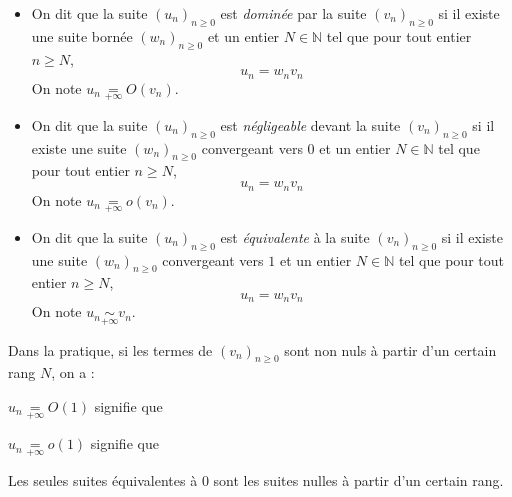 \documentclass[a4paper,10pt]{report}
\begin{document}
\begin{defin}

\begin{itemize}
\item On dit que la suite $(u_n)_{n \geq 0}$ est \textit{dominée} par la suite $(v_n)_{n \geq 0}$ si il existe une suite bornée $(w_n)_{n \geq 0}$ et un entier $N \in \mathbb{N}$ tel que pour tout entier $n \geq N$,
$$ u_n = w_n v_n$$
On note $u_n  \underset{+ \infty}{=} O(v_n)$.
\item On dit que la suite $(u_n)_{n \geq 0}$ est \textit{négligeable} devant la suite $(v_n)_{n \geq 0}$ si il existe une suite  $(w_n)_{n \geq 0}$ convergeant vers $0$ et un entier $N \in \mathbb{N}$ tel que pour tout entier $n \geq N$,
$$ u_n = w_n v_n$$
On note $u_n \underset{ + \infty}{=} o(v_n)$.
\item On dit que la suite $(u_n)_{n \geq 0}$ est \textit{équivalente} à la suite $(v_n)_{n \geq 0}$ si il existe une suite  $(w_n)_{n \geq 0}$ convergeant vers $1$ et un entier $N \in \mathbb{N}$ tel que pour tout entier $n \geq N$,
$$ u_n = w_n v_n$$
On note $u_n  \underset{ + \infty}{\sim} v_n$.
\end{itemize}
\end{defin}

\medskip

\noindent Dans la pratique, si les termes de $(v_n)_{n \geq 0}$ sont non nuls à partir d'un certain rang $N$, on a :
%
%

\newpage

\begin{rems}
\item $u_n  \underset{+ \infty}{=} O(1)$ signifie que 
\item $u_n  \underset{+ \infty}{=} o(1)$ signifie que 
\item Les seules suites équivalentes à $0$ sont les suites nulles à partir d'un certain rang.
\end{rems}
\end{document}
